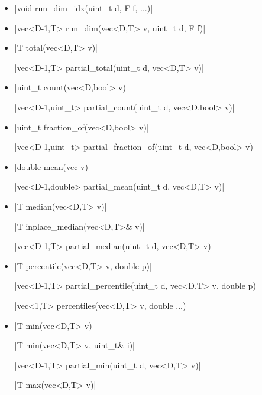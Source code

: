 \documentclass[12pt]{report}
\begin{document}
\begin{itemize}
\item \cppinline|void run_dim_idx(uint_t d, F f, ...)| 

\item \cppinline|vec<D-1,T> run_dim(vec<D,T> v, uint_t d, F f)| 

\item \cppinline|T total(vec<D,T> v)| 

\cppinline|vec<D-1,T> partial_total(uint_t d, vec<D,T> v)| 

\item \cppinline|uint_t count(vec<D,bool> v)| 

\cppinline|vec<D-1,uint_t> partial_count(uint_t d, vec<D,bool> v)| 

\item \cppinline|uint_t fraction_of(vec<D,bool> v)| 

\cppinline|vec<D-1,uint_t> partial_fraction_of(uint_t d, vec<D,bool> v)| 

\item \cppinline|double mean(vec v)| 

\cppinline|vec<D-1,double> partial_mean(uint_t d, vec<D,T> v)| 

\item \cppinline|T median(vec<D,T> v)| 

\cppinline|T inplace_median(vec<D,T>& v)| 

\cppinline|vec<D-1,T> partial_median(uint_t d, vec<D,T> v)| 

\item \cppinline|T percentile(vec<D,T> v, double p)| 

\cppinline|vec<D-1,T> partial_percentile(uint_t d, vec<D,T> v, double p)| 

\cppinline|vec<1,T> percentiles(vec<D,T> v, double ...)| 

\item \cppinline|T min(vec<D,T> v)| 

\cppinline|T min(vec<D,T> v, uint_t& i)|

\cppinline|vec<D-1,T> partial_min(uint_t d, vec<D,T> v)| 

\cppinline|T max(vec<D,T> v)| 


\end{itemize}
\end{document}
